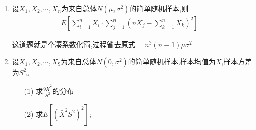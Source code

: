 \documentclass[12pt, a4paper, oneside, UTF8]{ctexbook}
\begin{document}
\begin{enumerate}[label=\arabic*.,start=3]
    \item 设$X_1,X_2,\cdots,X_n$为来自总体$N(\mu,\sigma^2)$的简单随机样本,则
    \begin{align*}
        E\left[\sum_{i=1}^{n}X_i\cdot\sum_{j=1}^{n}\left(nX_j-\sum_{k=1}^{n}X_k\right)^2\right]=
    \end{align*}
    
    \begin{solution}
    这道题就是个凑系数化简,过程省去$\text{原式}=n^3(n-1)\mu\sigma^2$
    \end{solution}
    
    \item 设$X_1,X_2,\cdots,X_9$为来自总体$N(0,\sigma^2)$的简单随机样本,样本均值为$\bar{X}$,样本方差为$S^2$。
    \begin{enumerate}
        \item[(1)]求$\frac{9\bar{X}^2}{S^2}$的分布
        \item[(2)]求$E[(\bar{X}^2S^2)^2]$;
    \end{enumerate}
    
\end{enumerate}
\ifx\allfiles\undefined
\end{document}
